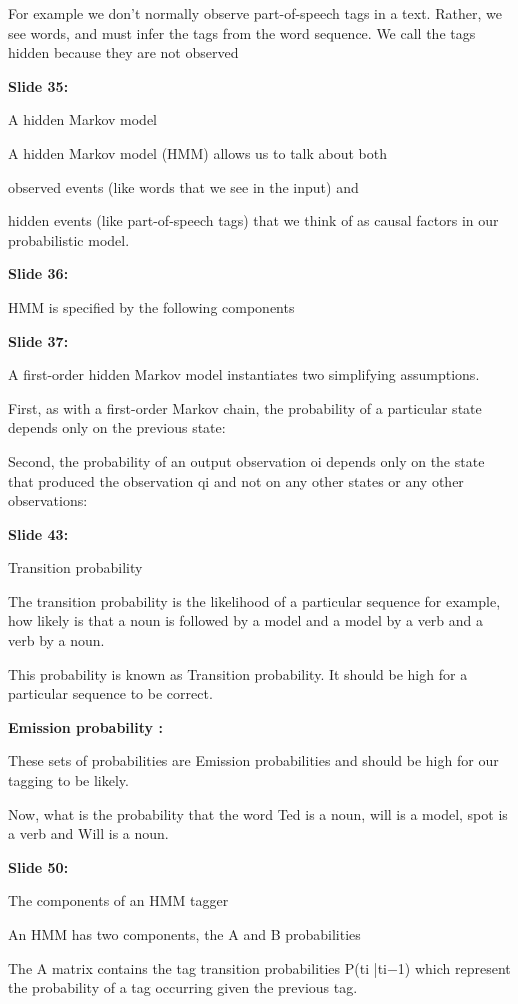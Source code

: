 \documentclass[11pt,a4paper]{article}
\begin{document}
For example we don’t normally observe part-of-speech tags in a text. Rather, we see words, and must infer the tags from the word sequence. We call the tags hidden because they are not observed

\textbf{Slide 35:}

A hidden Markov model

A hidden Markov model (HMM) allows us to talk about both

observed events (like words that we see in the input) and

hidden events (like part-of-speech tags) that we think of as causal factors in our probabilistic model.

\textbf{Slide 36:}

HMM is specified by the following components

\textbf{Slide 37:}

A first-order hidden Markov model instantiates two simplifying assumptions.

First, as with a first-order Markov chain, the probability of a particular state depends only on the previous state:

Second, the probability of an output observation oi depends only on the state that produced the observation qi and not on any other states or any other observations:

\textbf{Slide 43:}

Transition probability

The transition probability is the likelihood of a particular sequence for example, how likely is that a noun is followed by a model and a model by a verb and a verb by a noun.

This probability is known as Transition probability. It should be high for a particular sequence to be correct.

\textbf{Emission probability :} 

These sets of probabilities are Emission probabilities and should be high for our tagging to be likely.

Now, what is the probability that the word Ted is a noun, will is a model, spot is a verb and Will is a noun.

\textbf{Slide 50:}

The components of an HMM tagger

An HMM has two components, the A and B probabilities

The A matrix contains the tag transition probabilities P(ti |ti−1) which represent the probability of a tag occurring given the previous tag.
\end{document}

